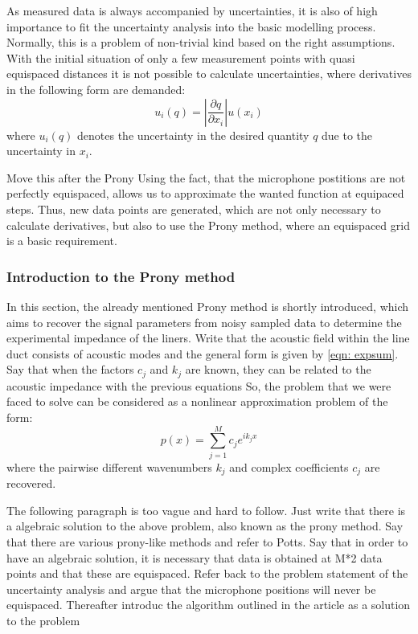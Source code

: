 \documentclass{article}
\begin{document}
As measured data is always accompanied by uncertainties, it is also of high importance to fit the uncertainty analysis into the basic modelling process.
Normally, this is a problem of non-trivial kind based on the right assumptions.
With the initial situation of only a few measurement points with quasi equispaced distances it is not possible to calculate uncertainties, where derivatives in the following form are demanded:
\begin{equation}
u_{i}(q)= \left\vert \frac{\partial q}{\partial x_{i}} \right\vert u( x_{i})
\end{equation}
where $u_{i}(q)$ denotes the uncertainty in the desired quantity $q$ due to the uncertainty in $x_{i}$.

{\color{red} Move this after the Prony Using the fact, that the microphone postitions are not perfectly equispaced, allows us to approximate the wanted function at equipaced steps.
Thus, new data points are generated, which are not only necessary to calculate derivatives, but also to use the Prony method, where an equispaced grid is a basic requirement. }

\subsubsection{Introduction to the Prony method}
In this section, the already mentioned Prony method is shortly introduced, which aims to recover the signal parameters from noisy sampled data to determine the experimental impedance of the liners.
{\color{red} Write that the acoustic field within the line duct consists of acoustic modes and the general form is given by \ref{eqn: expsum}. Say that when the factors $c_j$ and $k_j$ are known, they can be related to the acoustic impedance with the previous equations} 
So, the problem that we were faced to solve can be considered as a nonlinear approximation problem of the form:
\begin{equation}\label{eqn: expsum}
 p(x)=\sum\limits_{j=1}^M c_{j}e^{ik_{j}x} 
\end{equation}
where the pairwise different wavenumbers $k_{j}$ and complex coefficients $c_{j}$ are recovered.

{\color{red} The following paragraph is too vague and hard to follow. Just write that there is a algebraic solution to the above problem, also known as the prony method. Say that there are various prony-like methods and refer to Potts. Say that in order to have an algebraic solution, it is necessary that data is obtained at M*2 data points and that these are equispaced. Refer back to the problem statement of the uncertainty analysis and argue that the microphone positions will never be equispaced. Thereafter introduc the algorithm outlined in the article as a solution to the problem}
\end{document}
